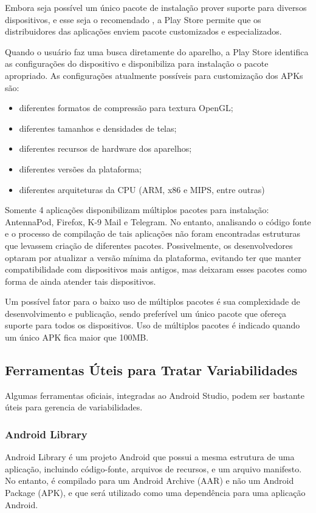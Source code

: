 Embora seja possível um único pacote de instalação prover suporte para diversos
dispositivos, e esse seja o recomendado \cite{multiple_apks}, a Play Store
permite que os distribuidores das aplicações enviem pacote customizados e especializados.

Quando o usuário faz uma busca diretamente do aparelho, a Play Store identifica as
configurações do dispositivo e disponibiliza para instalação o pacote apropriado.
As configurações atualmente possíveis para customização dos APKs são:
\begin{itemize}
    \item diferentes formatos de compressão para textura OpenGL;
    \item diferentes tamanhos e densidades de telas;
    \item diferentes recursos de hardware dos aparelhos;
    \item diferentes versões da plataforma;
    \item diferentes arquiteturas da CPU (ARM, x86 e MIPS, entre outras)
\end{itemize}

Somente 4 aplicações disponibilizam múltiplos pacotes para instalação: AntennaPod,
Firefox, K-9 Mail e Telegram. No entanto, analisando o código fonte e o processo
de compilação de tais aplicações não foram encontradas estruturas que levassem 
criação de diferentes pacotes. Possivelmente, os desenvolvedores optaram por
atualizar a versão mínima da plataforma, evitando ter que manter compatibilidade
com dispositivos mais antigos, mas deixaram esses pacotes como forma de ainda
atender tais dispositivos.

Um possível fator para o baixo uso de múltiplos pacotes é sua complexidade de
desenvolvimento e publicação, sendo preferível um único pacote que ofereça suporte
para todos os dispositivos. Uso de múltiplos pacotes é indicado quando um único
APK fica maior que 100MB.

\subsection{Ferramentas Úteis para Tratar Variabilidades}
\label{sec:ferramentas}

Algumas ferramentas oficiais, integradas ao Android Studio, podem ser bastante úteis
para gerencia de variabilidades.

\subsubsection{Android Library}
Android Library é um projeto Android que possui a mesma estrutura de uma aplicação,
incluindo código-fonte, arquivos de recursos, e um arquivo manifesto. No entanto,
é compilado para um Android Archive (AAR) e não um Android Package (APK),
e que será utilizado como uma dependência para uma aplicação Android.

